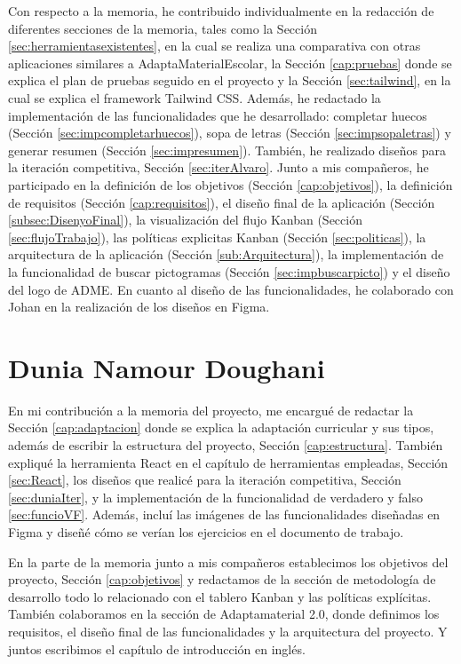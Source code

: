 Con respecto a la memoria, he contribuido individualmente en la redacción de diferentes secciones de la memoria, tales como la Sección \ref{sec:herramientasexistentes}, en la cual se realiza una comparativa con otras aplicaciones similares a AdaptaMaterialEscolar, la Sección \ref{cap:pruebas} donde se explica el plan de pruebas seguido en el proyecto y la Sección \ref{sec:tailwind}, en la cual se explica el framework Tailwind CSS. Además, he redactado la implementación de las funcionalidades que he desarrollado: completar huecos (Sección \ref{sec:impcompletarhuecos}), sopa de letras (Sección \ref{sec:impsopaletras}) y generar resumen (Sección \ref{sec:impresumen}). También, he realizado diseños para la iteración competitiva, Sección \ref{sec:iterAlvaro}. Junto a mis compañeros, he participado en la definición de los objetivos (Sección \ref{cap:objetivos}), la definición de requisitos (Sección \ref{cap:requisitos}), el diseño final de la aplicación (Sección \ref{subsec:DisenyoFinal}), la visualización del flujo Kanban (Sección \ref{sec:flujoTrabajo}), las políticas explicitas Kanban (Sección \ref{sec:politicas}), la arquitectura de la aplicación (Sección \ref{sub:Arquitectura}), la implementación de la funcionalidad de buscar pictogramas (Sección \ref{sec:impbuscarpicto}) y el diseño del logo de ADME. En cuanto al diseño de las funcionalidades, he colaborado con Johan en la realización de los diseños en Figma.

\section{Dunia Namour Doughani}
En mi contribución a la memoria del proyecto, me encargué de redactar la Sección \ref{cap:adaptacion} donde se explica la adaptación curricular y sus tipos, además de escribir la estructura del proyecto, Sección \ref{cap:estructura}. También expliqué la herramienta React en el capítulo de herramientas empleadas, Sección \ref{sec:React}, los diseños que realicé para la iteración competitiva, Sección \ref{sec:duniaIter}, y la implementación de la funcionalidad de verdadero y falso \ref{sec:funcioVF}. Además, incluí las imágenes de las funcionalidades diseñadas en Figma y diseñé cómo se verían los ejercicios en el documento de trabajo.

En la parte de la memoria junto a mis compañeros establecimos los objetivos del proyecto, Sección \ref{cap:objetivos} y redactamos de la sección de metodología de desarrollo todo lo relacionado con el tablero Kanban y las políticas explícitas. También colaboramos en la sección de Adaptamaterial 2.0, donde definimos los requisitos, el diseño final de las funcionalidades y la arquitectura del proyecto. Y juntos escribimos el capítulo de introducción en inglés.

